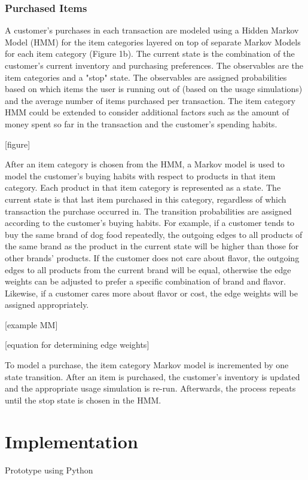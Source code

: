\documentclass[conference]{IEEEtran}
\begin{document}
\subsubsection{Purchased Items}

A customer’s purchases in each transaction are modeled using a Hidden Markov Model (HMM) for the item categories layered on top of separate Markov Models for each item category (Figure 1b).  The current state is the combination of the customer’s current inventory and purchasing preferences. The observables are the item categories and a "stop" state. The observables are assigned probabilities based on which items the user is running out of (based on the usage simulations) and the average number of items purchased per transaction. The item category HMM could be extended to consider additional factors such as the amount of money spent so far in the transaction and the customer's spending habits.

[figure]

After an item category is chosen from the HMM, a Markov model is used to model the customer's buying habits with respect to products in that item category.  Each product in that item category is represented as a state. The current state is that last item purchased in this category, regardless of which transaction the purchase occurred in. The transition probabilities are assigned according to the customer's buying habits.  For example, if a customer tends to buy the same brand of dog food repeatedly, the outgoing edges to all products of the same brand as the product in the current state will be higher than those for other brands' products. If the customer does not care about flavor, the outgoing edges to all products from the current brand will be equal, otherwise the edge weights can be adjusted to prefer a specific combination of brand and flavor.  Likewise, if a customer cares more about flavor or cost, the edge weights will be assigned appropriately.

[example MM]

[equation for determining edge weights]
	
To model a purchase, the item category Markov model is incremented by one state transition.  After an item is purchased, the customer's inventory is updated and the appropriate usage simulation is re-run.  Afterwards, the process repeats until the stop state is chosen in the HMM. 

\section{Implementation}
Prototype using Python
\end{document}
